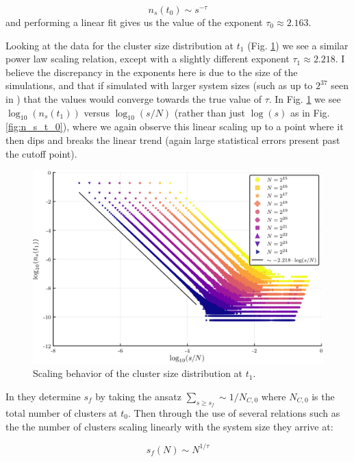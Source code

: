 \begin{equation}
	n_s(t_0) \sim s^{-\tau}
\end{equation}
and performing a linear fit gives us the value of the exponent $\tau_0 \approx 2.163$.

Looking at the data for the cluster size distribution at $t_1$ (Fig. \ref{fig:n_s_t_1}) we see a similar power law scaling relation, except with a slightly different exponent $\tau_1 \approx 2.218$.
I believe the discrepancy in the exponents here is due to the size of the simulations, and that if simulated with larger system sizes (such as up to $2^{37}$ seen in \cite{Lee_1}) that the values would converge towards the true value of $\tau$.
In Fig. \ref{fig:n_s_t_1} we see $\log_{10}(n_s(t_1))$ versus $\log_{10}(s/N)$ (rather than just $\log(s)$ as in Fig. \ref{fig:n_s_t_0}), where we again observe this linear scaling up to a point where it then dips and breaks the linear trend (again large statistical errors present past the cutoff point).

\begin{figure}[H]
	\centering
	\includegraphics[width=350pt, clip]{images/n_s_t_1.png}
	\caption{Scaling behavior of the cluster size distribution at $t_1$.}
	\label{fig:n_s_t_1}
\end{figure}

In \cite{Lee_1} they determine $s_f$ by taking the ansatz $\sum_{s \ge s_f} \sim 1 / N_{C, 0}$ where $N_{C, 0}$ is the total number of clusters at $t_0$.
Then through the use of several relations such as the the number of clusters scaling linearly with the system size they arrive at:

\begin{equation}
	s_f(N) \sim N^{1 / \tau}
\end{equation}

